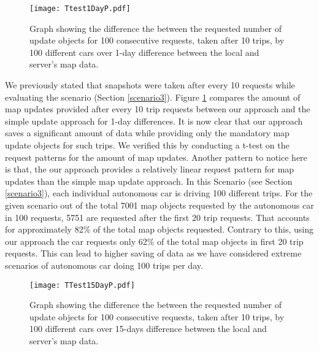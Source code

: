\begin{figure}
\centering
\texttt{[image: Ttest1DayP.pdf]}
\caption{Graph showing the difference the between the requested number of update objects for 100 consecutive requests, taken after 10 trips, by 100 different cars over 1-day difference between the local and server's map data.}
\label{fg:ber1d100}
\end{figure}

We previously stated that snapshots were taken after every 10 requests while evaluating the scenario (Section \ref{scenario3}). Figure \ref{fg:ber1d100} compares the amount of map updates provided after every 10 trip requests between our approach and the simple update approach for 1-day differences. It is now clear that our approach saves a significant amount of data while providing only the mandatory map update objects for such trips. We verified this by conducting a t-test on the request patterns for the amount of map updates. Another pattern to notice here is that, the our approach provides a relatively linear request pattern for map updates than the simple map update approach. In this Scenario (see Section \ref{scenario3}), each individual autonomous car is driving 100 different trips. For the given scenario out of the total 7001 map objects requested by the autonomous car in 100 requests, 5751 are requested after the first 20 trip requests. That accounts for approximately 82\% of the total map objects requested. Contrary to this, using our approach the car requests only 62\% of the total map objects in first 20 trip requests. This can lead to higher saving of data as we have considered extreme scenarios of autonomous car doing 100 trips per day. \\

\begin{figure}
\centering
\texttt{[image: TTest15DayP.pdf]}
\caption{Graph showing the difference the between the requested number of update objects for 100 consecutive requests, taken after 10 trips, by 100 different cars over 15-days difference between the local and server's map data.}
\label{fg:ber15d100}
\end{figure}

